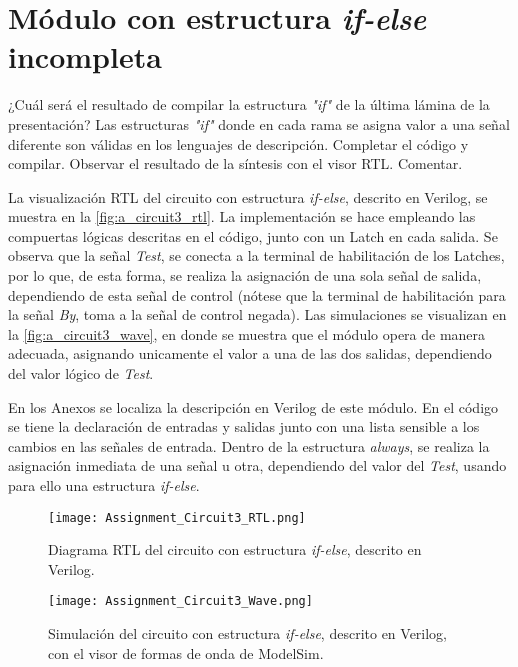 \section{Módulo con estructura \textit{if-else} incompleta \label{sec:s2}}

\begin{center}
	\begin{minipage}{12cm}
		\begin{tcolorbox}[title=Actividad 3]
			¿Cuál será el resultado de compilar la estructura \textit{"if"} de la última lámina de la presentación? Las estructuras \textit{"if"} donde en cada rama se asigna valor a una señal diferente son válidas en los lenguajes de descripción. Completar el código y compilar. Observar el resultado de la síntesis con el visor RTL. Comentar.
		\end{tcolorbox}	
	\end{minipage}
\end{center}

La visualización RTL del circuito con estructura \textit{if-else}, descrito en Verilog, se muestra en la \autoref{fig:a_circuit3_rtl}. La implementación se hace empleando las compuertas lógicas descritas en el código, junto con un Latch en cada salida. Se observa que la señal \textit{Test}, se conecta a la terminal de habilitación de los Latches, por lo que, de esta forma, se realiza la asignación de una sola señal de salida, dependiendo de esta señal de control (nótese que la terminal de habilitación para la señal \textit{By}, toma a la señal de control negada). Las simulaciones se visualizan en la \autoref{fig:a_circuit3_wave}, en donde se muestra que el módulo opera de manera adecuada, asignando unicamente el valor a una de las dos salidas, dependiendo del valor lógico de \textit{Test}.

En los Anexos se localiza la descripción en Verilog de este módulo. En el código se tiene la declaración de entradas y salidas junto con una lista sensible a los cambios en las señales de entrada. Dentro de la estructura \textit{always}, se realiza la asignación inmediata de una señal u otra, dependiendo del valor del \textit{Test}, usando para ello una estructura \textit{if-else}.

\begin{figure}[ht]
	\centering
	\texttt{[image: Assignment\_Circuit3\_RTL.png]}
	\caption{Diagrama RTL del circuito con estructura \textit{if-else}, descrito en Verilog. \label{fig:a_circuit3_rtl}}
\end{figure}

\begin{figure}[ht]
	\centering
	\texttt{[image: Assignment\_Circuit3\_Wave.png]}
	\caption{Simulación del circuito con estructura \textit{if-else}, descrito en Verilog, con el visor de formas de onda de ModelSim. \label{fig:a_circuit3_wave}}
\end{figure}